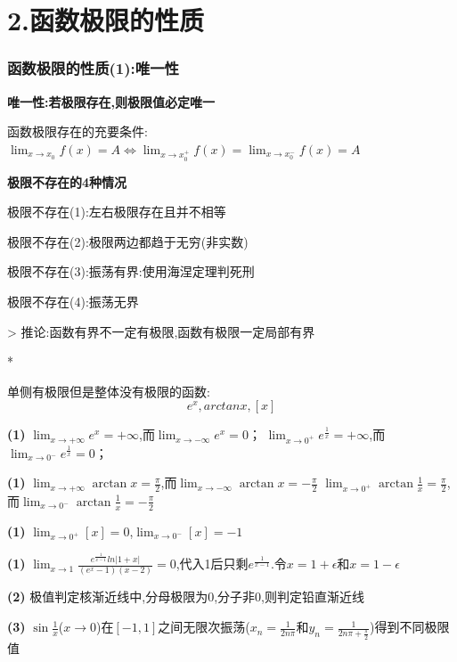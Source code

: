 \documentclass[11pt,a4paper,UTF8]{ctexart}
\begin{document}
\section{2.函数极限的性质}


\subsubsection{函数极限的性质(1):唯一性}

    \textbf{唯一性:若极限存在,则极限值必定唯一}

    函数极限存在的充要条件:$\lim_{x \to x_0} f(x) = A \iff \lim_{x \to x_0^+} f(x) = \lim_{x \to x_0^-} f(x) = A$

    \textbf{极限不存在的4种情况}

    极限不存在(1):左右极限存在且并不相等

    极限不存在(2):极限两边都趋于无穷(非实数)

    极限不存在(3):振荡有界:使用海涅定理判死刑

    极限不存在(4):振荡无界

\begin{solbox}[{分步推导与答题规范}]
    >   推论:函数有界不一定有极限,函数有极限一定局部有界
\end{solbox}

    \textit{}*

    \textit{}单侧有极限但是整体没有极限的函数:
\begin{equation*}
e^x,arctanx,[x]
\end{equation*}
\textit{}

\textbf{(1)} $\lim_{x \to +\infty} e^x = +\infty$,而$\lim_{x \to -\infty} e^x = 0$；	  $\lim_{x \to 0^+} e^{\frac{1}{x}} = +\infty$,而$\lim_{x \to 0^-} e^{\frac{1}{x}} = 0$；

\textbf{(1)} $\lim_{x \to +\infty} \arctan x = \frac{\pi}{2}$,而$\lim_{x \to -\infty} \arctan x = -\frac{\pi}{2}$	$\lim_{x \to 0^+} \arctan \frac{1}{x} = \frac{\pi}{2}$,而$\lim_{x \to 0^-} \arctan \frac{1}{x} = -\frac{\pi}{2}$

\textbf{(1)} $\lim_{x \to 0^+} [x] = 0$,$\lim_{x \to 0^-} [x] = -1$

\textbf{(1)} $\lim_{x\rightarrow 1}\frac{e^{\frac{1}{x-1}}ln|1+x|}{(e^x-1)(x-2)} = 0$,代入1后只剩$e^{\frac{1}{x-1}}$.令$x=1+\epsilon \text{和}x=1-\epsilon$

\textbf{(2)} 极值判定核渐近线中,分母极限为0,分子非0,则判定铅直渐近线

\textbf{(3)} $\sin\frac{1}{x}$($x \to 0$)在$[-1, 1]$之间无限次振荡($x_n = \frac{1}{2n\pi}$和$y_n = \frac{1}{2n\pi + \frac{\pi}{2}}$)得到不同极限值
\end{document}
